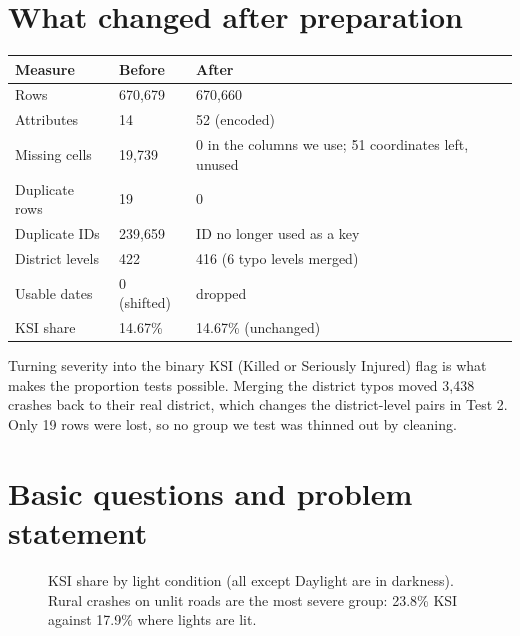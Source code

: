 \documentclass[10pt,a4paper,twocolumn]{article}
\begin{document}
\section{What changed after preparation}

{\footnotesize
\begin{tabularx}{\linewidth}{@{}L{2.9cm} L{1.7cm} Y@{}}
\toprule
\textbf{Measure} & \textbf{Before} & \textbf{After} \\
\midrule
Rows & 670{,}679 & 670{,}660 \\
Attributes & 14 & 52 (encoded) \\
Missing cells & 19{,}739 & 0 in the columns we use; 51 coordinates left, unused \\
Duplicate rows & 19 & 0 \\
Duplicate IDs & 239{,}659 & ID no longer used as a key \\
District levels & 422 & 416 (6 typo levels merged) \\
Usable dates & 0 (shifted) & dropped \\
KSI share & 14.67\% & 14.67\% (unchanged) \\
\bottomrule
\end{tabularx}}

Turning severity into the binary KSI (Killed or Seriously Injured) flag is what makes the proportion tests possible. Merging
the district typos moved 3{,}438 crashes back to their real district, which changes the
district-level pairs in Test 2. Only 19 rows were lost, so no group we test was thinned out by
cleaning.

\section{Basic questions and problem statement}

\begin{figure}[!ht]
\centering
{}
\caption{KSI share by light condition (all except Daylight are in darkness). Rural crashes on
unlit roads are the most severe group: 23.8\% KSI against 17.9\% where lights are lit.}
\label{fig:light}
\end{figure}
\end{document}
